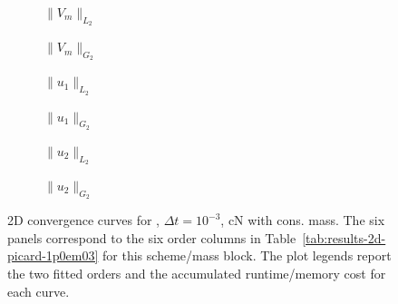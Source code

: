 \begin{figure}[p]
\centering
\begin{subfigure}{0.485\linewidth}
\centering
{}
\caption{$\|V_m\|_{L_2}$}
\label{fig:results-2d-picard-1p0em03-cranknicolson-consistent-a}
\end{subfigure}
\hfill
\begin{subfigure}{0.485\linewidth}
\centering
{}
\caption{$\|V_m\|_{G_2}$}
\label{fig:results-2d-picard-1p0em03-cranknicolson-consistent-b}
\end{subfigure}
\par\vspace{0.8em}
\begin{subfigure}{0.485\linewidth}
\centering
{}
\caption{$\|u_1\|_{L_2}$}
\label{fig:results-2d-picard-1p0em03-cranknicolson-consistent-c}
\end{subfigure}
\hfill
\begin{subfigure}{0.485\linewidth}
\centering
{}
\caption{$\|u_1\|_{G_2}$}
\label{fig:results-2d-picard-1p0em03-cranknicolson-consistent-d}
\end{subfigure}
\par\vspace{0.8em}
\begin{subfigure}{0.485\linewidth}
\centering
{}
\caption{$\|u_2\|_{L_2}$}
\label{fig:results-2d-picard-1p0em03-cranknicolson-consistent-e}
\end{subfigure}
\hfill
\begin{subfigure}{0.485\linewidth}
\centering
{}
\caption{$\|u_2\|_{G_2}$}
\label{fig:results-2d-picard-1p0em03-cranknicolson-consistent-f}
\end{subfigure}
\caption{2D convergence curves for , $\Delta t=10^{-3}$, cN with cons. mass. The six panels correspond to the six order columns in Table~\ref{tab:results-2d-picard-1p0em03} for this scheme/mass block. The plot legends report the two fitted orders and the accumulated runtime/memory cost for each curve.}
\label{fig:results-2d-picard-1p0em03-cranknicolson-consistent}
\end{figure}
\FloatBarrier

